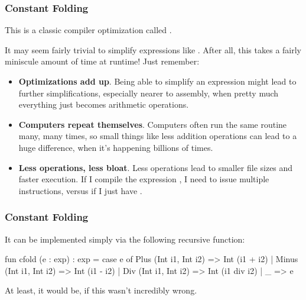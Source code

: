 \documentclass[aspectratio=169, handout]{beamer}
\begin{document}
\begin{frame}[fragile]
  \frametitle{Constant Folding}

  This is a classic compiler optimization called .

  \pause
  \vspace{\fill}


  \pause
  \vspace{\fill}

  It may seem fairly trivial to simplify expressions like . After
  all, this takes a fairly miniscule amount of time at runtime! Just remember:
  \pause
  \begin{itemize}
    \item \textbf{Optimizations add up}. Being able to simplify an expression
    might lead to further simplifications, especially nearer to
    assembly, when pretty much everything just becomes arithmetic operations. \pause
    \item \textbf{Computers repeat themselves}. Computers often run the same routine many, many times, so small
    things like less addition operations can lead to a huge difference, when
    it's happening billions of times. \pause
    \item \textbf{Less operations, less bloat}. Less operations lead to smaller file
    sizes and faster execution. If I compile the expression , I need to issue
    multiple instructions, versus if I just have .
  \end{itemize}
\end{frame}

\begin{frame}[fragile]
  \frametitle{Constant Folding}

  It can be implemented simply via the following recursive function:

  \pause
  {\small
  \begin{codeblock}
    fun cfold (e : exp) : exp =
      case e of
        Plus  (Int i1, Int i2) => Int (i1 + i2)
      | Minus (Int i1, Int i2) => Int (i1 - i2)
      | Div   (Int i1, Int i2) => Int (i1 div i2)
      | _ => e
  \end{codeblock}
  }

  \pause
  \vspace{\fill}

  At least, it would be, if this wasn't incredibly wrong.
\end{frame}
\end{document}

